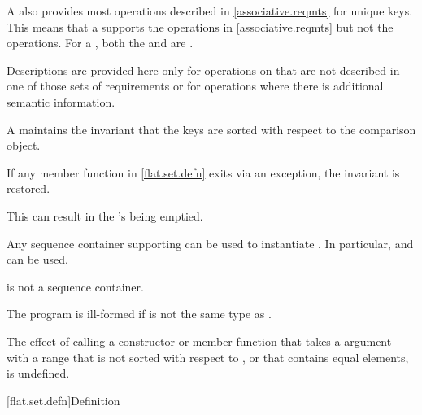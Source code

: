 \pnum
A  also provides most operations
described in \ref{associative.reqmts} for unique keys.
This means that a  supports
the  operations in \ref{associative.reqmts}
but not the  operations.
For a ,
both the  and  are .

\pnum
Descriptions are provided here only for operations on 
that are not described in one of those sets of requirements or
for operations where there is additional semantic information.

\pnum
A  maintains the invariant that the keys are sorted with
respect to the comparison object.

\pnum
If any member function in \ref{flat.set.defn} exits via an exception,
the invariant is restored.
\begin{note}
This can result in the 's being emptied.
\end{note}

\pnum
Any sequence container
supporting 
can be used to instantiate .
In particular,  and 
can be used.
\begin{note}
 is not a sequence container.
\end{note}

\pnum
The program is ill-formed if  is not the same type
as .

\pnum
The effect of calling a constructor or member function
that takes a  argument
with a range that is not sorted with respect to , or
that contains equal elements, is undefined.

[flat.set.defn]{Definition}

